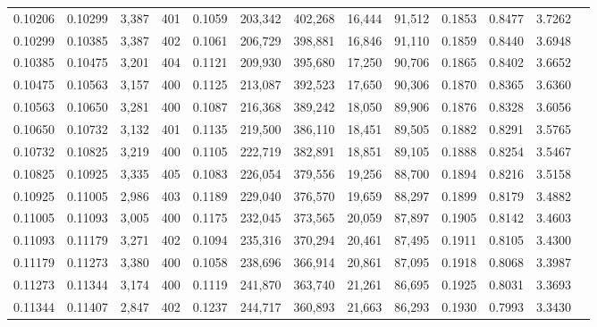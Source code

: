 \begin{tabular}{rrrrrrrrrrrrr}
0.10206 & 0.10299 &  3,387 & 401 &                                     0.1059 & 203,342 & 402,268 &  16,444 &  91,512 & 0.1853 & 0.8477 & 3.7262 \\
0.10299 & 0.10385 &  3,387 & 402 &                                     0.1061 & 206,729 & 398,881 &  16,846 &  91,110 & 0.1859 & 0.8440 & 3.6948 \\
0.10385 & 0.10475 &  3,201 & 404 &                                     0.1121 & 209,930 & 395,680 &  17,250 &  90,706 & 0.1865 & 0.8402 & 3.6652 \\
0.10475 & 0.10563 &  3,157 & 400 &                                     0.1125 & 213,087 & 392,523 &  17,650 &  90,306 & 0.1870 & 0.8365 & 3.6360 \\
0.10563 & 0.10650 &  3,281 & 400 &                                     0.1087 & 216,368 & 389,242 &  18,050 &  89,906 & 0.1876 & 0.8328 & 3.6056 \\
0.10650 & 0.10732 &  3,132 & 401 &                                     0.1135 & 219,500 & 386,110 &  18,451 &  89,505 & 0.1882 & 0.8291 & 3.5765 \\
0.10732 & 0.10825 &  3,219 & 400 &                                     0.1105 & 222,719 & 382,891 &  18,851 &  89,105 & 0.1888 & 0.8254 & 3.5467 \\
0.10825 & 0.10925 &  3,335 & 405 &                                     0.1083 & 226,054 & 379,556 &  19,256 &  88,700 & 0.1894 & 0.8216 & 3.5158 \\
0.10925 & 0.11005 &  2,986 & 403 &                                     0.1189 & 229,040 & 376,570 &  19,659 &  88,297 & 0.1899 & 0.8179 & 3.4882 \\
0.11005 & 0.11093 &  3,005 & 400 &                                     0.1175 & 232,045 & 373,565 &  20,059 &  87,897 & 0.1905 & 0.8142 & 3.4603 \\
0.11093 & 0.11179 &  3,271 & 402 &                                     0.1094 & 235,316 & 370,294 &  20,461 &  87,495 & 0.1911 & 0.8105 & 3.4300 \\
0.11179 & 0.11273 &  3,380 & 400 &                                     0.1058 & 238,696 & 366,914 &  20,861 &  87,095 & 0.1918 & 0.8068 & 3.3987 \\
0.11273 & 0.11344 &  3,174 & 400 &                                     0.1119 & 241,870 & 363,740 &  21,261 &  86,695 & 0.1925 & 0.8031 & 3.3693 \\
0.11344 & 0.11407 &  2,847 & 402 &                                     0.1237 & 244,717 & 360,893 &  21,663 &  86,293 & 0.1930 & 0.7993 & 3.3430 \\

\end{tabular}
